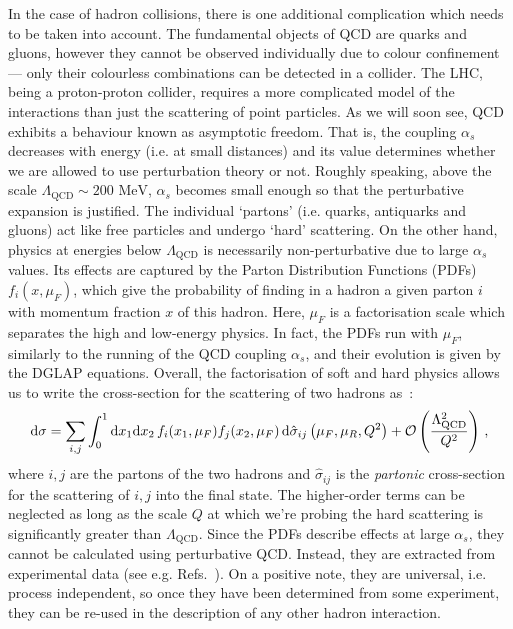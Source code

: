 \documentclass[main.tex]{subfiles}
\begin{document}
In the case of hadron collisions, there is one additional complication which needs to be taken into account. The fundamental objects of QCD are quarks and gluons, however they cannot be observed individually due to colour confinement --- only their colourless combinations can be detected in a collider. The LHC, being a proton-proton collider, requires a more complicated model of the interactions than just the scattering of point particles. As we will soon see, QCD exhibits a behaviour known as asymptotic freedom. That is, the coupling $\alpha_s$ decreases with energy (i.e. at small distances) and its value determines whether we are allowed to use perturbation theory or not. Roughly speaking, above the scale $\Lambda_\text{QCD} \sim 200 \text{ MeV}$, $\alpha_s$ becomes small enough so that the perturbative expansion is justified. The individual `partons' (i.e. quarks, antiquarks and gluons) act like free particles and undergo `hard' scattering\cite{PhysRevLett.23.1415}. On the other hand, physics at energies below $\Lambda_\text{QCD}$ is necessarily non-perturbative due to large $\alpha_s$ values. Its effects are captured by the Parton Distribution Functions (PDFs) $f_i(x, \mu_F)$, which give the probability of finding in a hadron a given parton $i$ with momentum fraction $x$ of this hadron. Here, $\mu_F$ is a factorisation scale which separates the high and low-energy physics. In fact, the PDFs run with $\mu_F$, similarly to the running of the QCD coupling $\alpha_s$, and their evolution is given by the DGLAP equations.
Overall, the factorisation of soft and hard physics allows us to write the cross-section for the scattering of two hadrons as~\cite{Collins:1989gx}:
\begin{equation} \label{eq:factorisation}
    \mathrm{d} \sigma = \sum_{i,j} \int_0^1 \mathrm{d} x_1 \mathrm{d} x_2 \, f_i(x_1, \mu_F) f_j(x_2, \mu_F) \, \mathrm{d} \hat{\sigma}_{ij}\left(\mu_F, \mu_R, Q^2\right) + \mathcal{O}\left(\frac{\Lambda_\text{QCD}^2}{Q^2}\right)\,,
\end{equation}
where $i, j$ are the partons of the two hadrons and $\hat{\sigma}_{ij}$ is the \textit{partonic} cross-section for the scattering of $i,j$ into the final state. The higher-order terms can be neglected as long as the scale $Q$ at which we're probing the hard scattering is significantly greater than $\Lambda_{\text{QCD}}$. Since the PDFs describe effects at large $\alpha_s$, they cannot be calculated using perturbative QCD. Instead, they are extracted from experimental data (see e.g. Refs.~\cite{H1:2015ubc, Alekhin:2017kpj, Hou:2019efy, NNPDF:2021uiq, Buckley:2014ana}). On a positive note, they are universal, i.e. process independent, so once they have been determined from some experiment, they can be re-used in the description of any other hadron interaction. 
\end{document}
